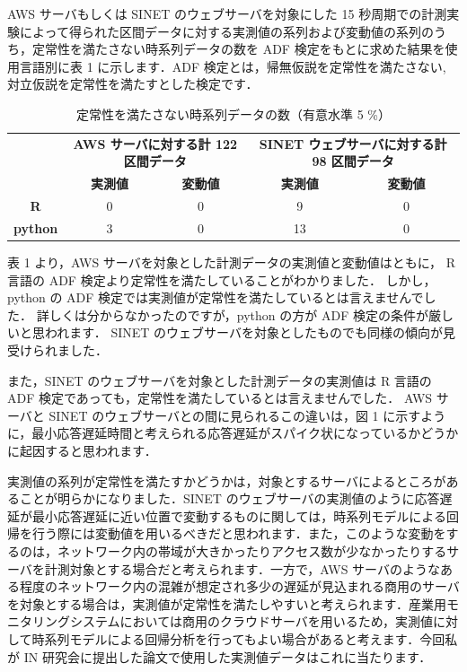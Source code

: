 \documentclass[a4j]{jarticle}
\begin{document}
 AWS サーバもしくは SINET のウェブサーバを対象にした 15 秒周期での計測実験によって得られた区間データに対する実測値の系列および変動値の系列のうち，定常性を満たさない時系列データの数を ADF 検定をもとに求めた結果を使用言語別に表 1 に示します．ADF 検定とは，帰無仮説を定常性を満たさない, 対立仮説を定常性を満たすとした検定です．
 \begin{table}[tb]
 \centering
 \caption{定常性を満たさない時系列データの数（有意水準 5 \%）}
 \begin{tabular}{|c||c|c|c|c|}
 \hline
 & \multicolumn{2}{|c|}{{\bf AWS サーバに対する計 122 区間データ}} & \multicolumn{2}{|c|}{{\bf SINET ウェブサーバに対する計 98 区間データ}}\\
 \cline{2-5}
 & {\bf \hspace{1cm}実測値\hspace{1cm}} & {\bf 変動値} & {\bf \hspace{1cm}実測値\hspace{1cm}} & {\bf 変動値}\\
 \hline
 \hline
 {\bf R} & 0 & 0 & 9 & 0\\
 \hline
 {\bf python} & 3 & 0 & 13 & 0\\
 \hline
 \end{tabular}
 \end{table}
表 1 より，AWS サーバを対象とした計測データの実測値と変動値はともに， R 言語の ADF 検定より定常性を満たしていることがわかりました．
しかし，python の ADF 検定では実測値が定常性を満たしているとは言えませんでした．
詳しくは分からなかったのですが，python の方が ADF 検定の条件が厳しいと思われます．
 SINET のウェブサーバを対象としたものでも同様の傾向が見受けられました．
  
また，SINET のウェブサーバを対象とした計測データの実測値は R 言語の ADF 検定であっても，定常性を満たしているとは言えませんでした．
 AWS サーバと SINET のウェブサーバとの間に見られるこの違いは，図 1 に示すように，最小応答遅延時間と考えられる応答遅延がスパイク状になっているかどうかに起因すると思われます．

実測値の系列が定常性を満たすかどうかは，対象とするサーバによるところがあることが明らかになりました．SINET のウェブサーバの実測値のように応答遅延が最小応答遅延に近い位置で変動するものに関しては，時系列モデルによる回帰を行う際には変動値を用いるべきだと思われます．また，このような変動をするのは，ネットワーク内の帯域が大きかったりアクセス数が少なかったりするサーバを計測対象とする場合だと考えられます．一方で，AWS サーバのようなある程度のネットワーク内の混雑が想定され多少の遅延が見込まれる商用のサーバを対象とする場合は，実測値が定常性を満たしやすいと考えられます．産業用モニタリングシステムにおいては商用のクラウドサーバを用いるため，実測値に対して時系列モデルによる回帰分析を行ってもよい場合があると考えます．今回私が IN 研究会に提出した論文で使用した実測値データはこれに当たります．
\end{document}
